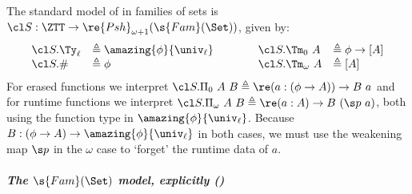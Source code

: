 \begin{definition}\label{def:std-model} The standard
 model of \ZTT in families of sets is $\cl S : \ZTT \to \re{Psh}_{\omega + 1}(\s{Fam}(\Set))$,
 given by:
  \[
  \begin{array}{ll@{\qquad\qquad}ll}
    \cl S.\Ty_\ell &\triangleq \amazing{\phi}{\univ_\ell} &
    \cl S.\Tm_0\ A &\triangleq  \phi \to [A] \\
    \cl S.\# &\triangleq \phi &
    \cl S.\Tm_\omega\ A &\triangleq [A]
  \end{array}
  \]
For erased functions we interpret $\cl S.\Pi_0\ A\ B \triangleq \re (a : (\phi \to A))
\to B\ a$ and for runtime functions we interpret $\cl S.\Pi_\omega\ A\ B \triangleq
\re (a : A) \to B\ (\s p\ a)$, both using the function type in
$\amazing{\phi}{\univ_\ell}$. Because $B : (\phi \to A) \to
\amazing{\phi}{\univ_\ell}$ in both cases, we must use the weakening map $\s p$
in the $\omega$ case to `forget' the runtime data of $a$.
\end{definition}
   

\subparagraph{The $\s{Fam}(\Set)$ model, explicitly ()}\label{ssub:famset}

